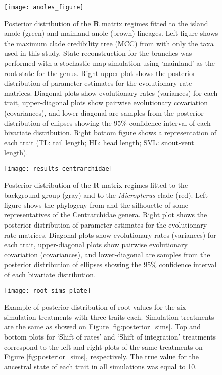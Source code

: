 \pagebreak

\begin{figure}[h]
	\centering
	\texttt{[image: anoles\_figure]}
	\caption{Posterior distribution of the $\mathbf{R}$ matrix regimes fitted to the island anole (green) and mainland anole (brown) lineages. Left figure shows the maximum clade credibility tree (MCC) from \citet{gamble_anolis_2014} with only the taxa used in this study. State reconstruction for the branches was performed with a stochastic map simulation using `mainland' as the root state for the genus. Right upper plot shows the posterior distribution of parameter estimates for the evolutionary rate matrices. Diagonal plots show evolutionary rates (variances) for each trait, upper-diagonal plots show pairwise evolutionary covariation (covariances), and lower-diagonal are samples from the posterior distribution of ellipses showing the 95\% confidence interval of each bivariate distribution. Right bottom figure shows a representation of each trait (TL: tail length; HL: head length; SVL: snout-vent length).}
	\label{fig:anoles}
\end{figure}

\pagebreak

\begin{figure}[h]
	\centering
	\texttt{[image: results\_centrarchidae]}
	\caption{Posterior distribution of the $\mathbf{R}$ matrix regimes fitted to the background group (gray) and to the \textit{Micropterus} clade (red). Left figure shows the phylogeny from \citep{revell_phylogenetic_2009} and the silhouette of some representatives of the Centrarchidae genera. Right plot shows the posterior distribution of parameter estimates for the evolutionary rate matrices. Diagonal plots show evolutionary rates (variances) for each trait, upper-diagonal plots show pairwise evolutionary covariation (covariances), and lower-diagonal are samples from the posterior distribution of ellipses showing the 95\% confidence interval of each bivariate distribution.}
	\label{fig:centrarchidae}
\end{figure}

\pagebreak

\begin{figure}[h]
	\centering
	\texttt{[image: root\_sims\_plate]}
	\caption{Example of posterior distribution of root values for the six simulation treatments with three traits each. Simulation treatments are the same as showed on Figure \ref{fig:posterior_sims}. Top and bottom plots for `Shift of rates' and `Shift of integration' treatments correspond to the left and right plots of the same treatments on Figure \ref{fig:posterior_sims}, respectively. The true value for the ancestral state of each trait in all simulations was equal to 10.}
	\label{fig:sup_root_sims}
\end{figure}

